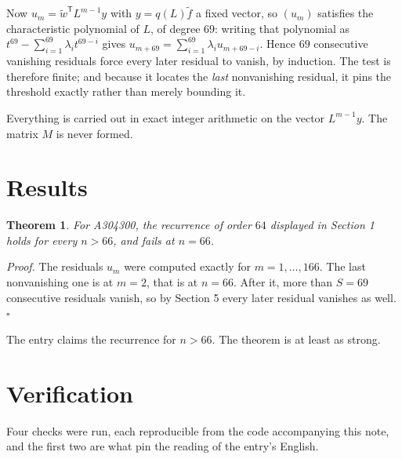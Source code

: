 \documentclass[11pt]{article}
\newtheorem{theorem}{Theorem}
\theoremstyle{definition}
\begin{document}
Now $u_m = \tilde w^{\mathsf T} L^{m-1} y$ with $y = q(L)\tilde f$ a fixed vector, so $(u_m)$ satisfies the characteristic polynomial of $L$, of degree $69$: writing that polynomial as $t^{69} - \sum_{i=1}^{69} \lambda_i t^{69-i}$ gives $u_{m+69} = \sum_{i=1}^{69} \lambda_i u_{m+69-i}$. Hence $69$ consecutive vanishing residuals force every later residual to vanish, by induction. The test is therefore finite; and because it locates the {\itshape last} nonvanishing residual, it pins the threshold exactly rather than merely bounding it.

Everything is carried out in exact integer arithmetic on the vector $L^{m-1}y$. The matrix $M$ is never formed.

\section{Results}

\begin{theorem} For A304300, the recurrence of order $64$ displayed in Section 1 holds for every $n > 66$, and fails at $n = 66$.\end{theorem}

{\itshape Proof.} The residuals $u_m$ were computed exactly for $m = 1,\dots,166$. The last nonvanishing one is at $m = 2$, that is at $n = 66$. After it, more than $S = 69$ consecutive residuals vanish, so by Section 5 every later residual vanishes as well. $\square$

The entry claims the recurrence for $n > 66$. The theorem is at least as strong.

\section{Verification}

Four checks were run, each reproducible from the code accompanying this note, and the first two are what pin the reading of the entry's English.
\end{document}
